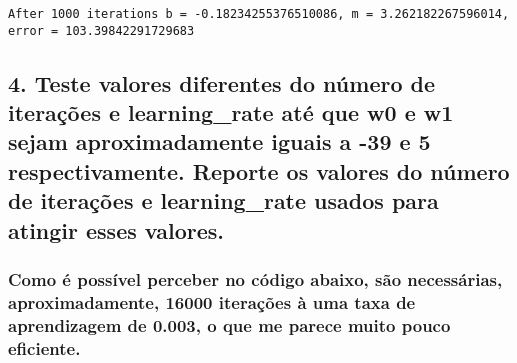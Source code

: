 \documentclass[11pt]{article}
\begin{document}
    
    
    \begin{Verbatim}[commandchars=\\\{\}]
After 1000 iterations b = -0.18234255376510086, m = 3.262182267596014, error = 103.39842291729683

    \end{Verbatim}

    \subsection{4. Teste valores diferentes do número de iterações e
learning\_rate até que w0 e w1 sejam aproximadamente iguais a -39 e 5
respectivamente. Reporte os valores do número de iterações e
learning\_rate usados para atingir esses
valores.}\label{teste-valores-diferentes-do-nuxfamero-de-iterauxe7uxf5es-e-learning_rate-atuxe9-que-w0-e-w1-sejam-aproximadamente-iguais-a--39-e-5-respectivamente.-reporte-os-valores-do-nuxfamero-de-iterauxe7uxf5es-e-learning_rate-usados-para-atingir-esses-valores.}

\subsubsection{Como é possível perceber no código abaixo, são
necessárias, aproximadamente, 16000 iterações à uma taxa de aprendizagem
de 0.003, o que me parece muito pouco
eficiente.}\label{como-uxe9-possuxedvel-perceber-no-cuxf3digo-abaixo-suxe3o-necessuxe1rias-aproximadamente-16000-iterauxe7uxf5es-uxe0-uma-taxa-de-aprendizagem-de-0.003-o-que-me-parece-muito-pouco-eficiente.}
\end{document}

